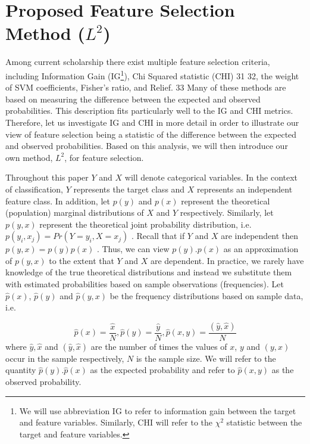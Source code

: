 \documentclass[review]{elsarticle}
\begin{document}
\section{Proposed Feature Selection Method ($ L^2 $)}

Among current scholarship there exist multiple feature selection criteria, including Information Gain (IG\footnote{We will use abbreviation IG to refer to information gain between the target and feature variables. Similarly, CHI will refer to the $ \ensuremath{\chi}^2 $ statistic between the target and feature variables.}), Chi Squared statistic (CHI) \cite{Quinlan1986, Liu1995} 31 32, the  weight of SVM coefficients, Fisher’s ratio, and Relief.\cite{Hegde2014} 33  Many of these methods are based on measuring the difference between the expected and observed probabilities.  This description fits particularly well to the IG and CHI metrics. Therefore, let us investigate IG and CHI in more detail in order to illustrate our view of feature selection being a statistic of the difference between the expected and observed probabilities. Based on this analysis, we will then introduce our own method, $ L^2 $, for feature selection.

Throughout this paper $ Y $ and $ X $ will denote categorical variables. In the context of classification, $ Y $ represents the target class and $ X $ represents an independent feature class. In addition, let $ p(y) $  and $ p(x) $  represent the theoretical (population) marginal distributions of $ X $ and  $ Y $ respectively. Similarly, let $ p(y,x) $  represent the theoretical joint probability distribution, i.e. $ p(y_{i},x_{j}) = Pr(Y = y_{i}, X = x_{j})$ . Recall that if $ Y $ and $ X $ are independent then $ p(y, x) = p(y) p(x) $ . Thus, we can view $ p(y). p(x) $ as an approximation of $ p(y, x) $  to the extent that $ Y $ and $ X $ are dependent. In practice, we rarely have knowledge of the true theoretical distributions and instead we substitute them with estimated probabilities based on sample observations (frequencies). Let $ \hat{p}(x) $, $ \hat{p}(y) $ and $ \hat{p}(y,x) $ be the frequency distributions based on sample data, i.e.

\[ 
 \hat{p}(x) = \frac{\hat{x}}{N} ,  \hat{p}(y) = \frac{\hat{y}}{N} ,  \hat{p}(x,y)= \frac {(\hat{y}, \hat{x})}{ N}
 \]
 where $ \hat{y}, \hat{x} $ and $ (\hat{y}, \hat{x}) $ are the number of times the values of $ x $, $ y $ and $ (y, x) $ occur in the sample respectively, $ N $ is the sample size. We will refer to the quantity $ \hat{p}(y).\hat{p}(x) $ as the expected probability and refer to $ \hat{p}(x,y) $ as the observed probability.
\end{document}
